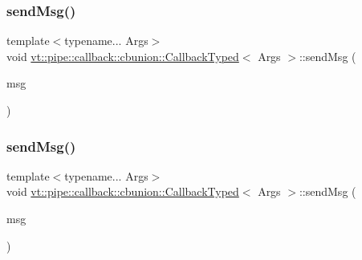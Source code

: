 \mbox{\label{structvt_1_1pipe_1_1callback_1_1cbunion_1_1_callback_typed_a9dc1f441d1444b9b3404509cc2afe768}} 
\subsubsection{\texorpdfstring{send\+Msg()}{sendMsg()}\hspace{0.1cm}{\footnotesize\ttfamily [1/2]}}
{\footnotesize\ttfamily template$<$typename... Args$>$ \\
void \hyperlink{structvt_1_1pipe_1_1callback_1_1cbunion_1_1_callback_typed}{vt\+::pipe\+::callback\+::cbunion\+::\+Callback\+Typed}$<$ Args $>$\+::send\+Msg (\begin{DoxyParamCaption}\item[{\hyperlink{structvt_1_1messaging_1_1_msg_ptr_thief}{messaging\+::\+Msg\+Ptr\+Thief}$<$ typename \hyperlink{structvt_1_1_c_b_traits}{C\+B\+Traits}$<$ Args... $>$\+::MsgT $>$}]{msg }\end{DoxyParamCaption})\hspace{0.3cm}{\ttfamily [inline]}}

\mbox{\label{structvt_1_1pipe_1_1callback_1_1cbunion_1_1_callback_typed_aa8d1b59ff3d662bea81b5f359fdd6d3b}} 
\subsubsection{\texorpdfstring{send\+Msg()}{sendMsg()}\hspace{0.1cm}{\footnotesize\ttfamily [2/2]}}
{\footnotesize\ttfamily template$<$typename... Args$>$ \\
void \hyperlink{structvt_1_1pipe_1_1callback_1_1cbunion_1_1_callback_typed}{vt\+::pipe\+::callback\+::cbunion\+::\+Callback\+Typed}$<$ Args $>$\+::send\+Msg (\begin{DoxyParamCaption}\item[{typename \hyperlink{structvt_1_1_c_b_traits}{C\+B\+Traits}$<$ Args... $>$\+::MsgT $\ast$}]{msg }\end{DoxyParamCaption})\hspace{0.3cm}{\ttfamily [inline]}}

